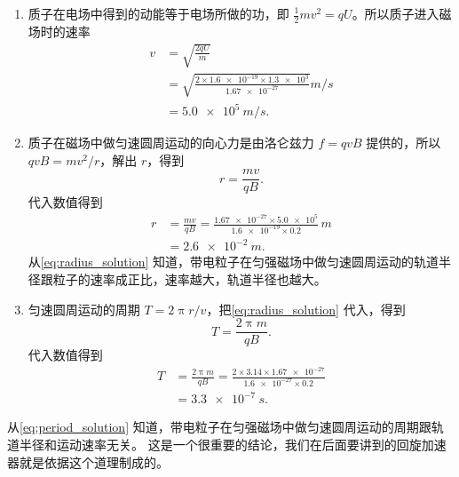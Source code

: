 \begin{solution}
\begin{enumerate}
  \item 质子在电场中得到的动能等于电场所做的功，即 $\frac{1}{2}mv^2=qU$。所以质子进入磁场时的速率
  \[\begin{split}
  v&=\sqrt{\frac{2qU}{m}}\\
  &=\sqrt{\frac{2\times \num{1.6e-19}\times \num{1.3e3}}{\num{1.67e-27}}}\unit{m/s}\\
  &=\qty{5.0e5}{m/s}.
  \end{split}\]
  \item 质子在磁场中做匀速圆周运动的向心力是由洛仑兹力 $f=qvB$ 提供的，所以 $qvB=mv^2/r$，解出 $r$，得到
  \begin{equation}
    \label{eq:radius_solution}
    r=\frac{mv}{qB}.
  \end{equation}
  代入数值得到
  \[\begin{split}
  r&=\frac{mv}{qB}=\frac{\num{1.67e-27}\times \num{5.0e5}}{\num{1.6e-19}\times 0.2}\,\unit{m}\\
  &=\qty{2.6e-2}{m}.
  \end{split}\]
  从\cref{eq:radius_solution} 知道，带电粒子在匀强磁场中做匀速圆周运动的轨道半径跟粒子的速率成正比，速率越大，轨道半径也越大。

  \item 匀速圆周运动的周期 $T=2\uppi r/v$，把\cref{eq:radius_solution} 代入，得到
  \begin{equation}
    \label{eq:period_solution}
    T=\frac{2\uppi m}{qB}.
  \end{equation}
  代入数值得到
  \[\begin{split}
    T&=\frac{2\uppi m}{qB}=\frac{2\times 3.14\times\num{1.67e-27}}{\num{1.6e-27}\times 0.2}\\
    &=\qty{3.3e-7}{s}.
  \end{split}\]
\end{enumerate}
\end{solution}

从\cref{eq:period_solution} 知道，带电粒子在匀强磁场中做匀速圆周运动的周期跟轨道半径和运动速率无关。
这是一个很重要的结论，我们在后面要讲到的回旋加速器就是依据这个道理制成的。
        

